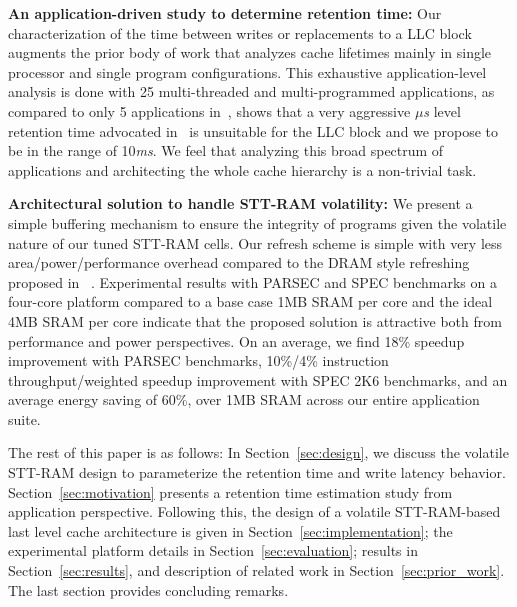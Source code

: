\noindent\textbf{An application-driven study to determine retention time:}
Our characterization of the time between writes or replacements to a LLC block
augments the prior body of work that analyzes cache lifetimes mainly in
single processor and single program configurations. This exhaustive application-level analysis is done with
25 multi-threaded and multi-programmed applications, as compared to only 5 applications in~\cite{STTRAM:HPCA11},
shows that a very aggressive {\it $\mu$s} level retention time advocated in~\cite{STTRAM:HPCA11} is
unsuitable for the LLC block and we propose to be in the range of 10{\it ms}.
We feel that analyzing this broad spectrum of applications and architecting the 
whole cache hierarchy is a non-trivial task.


\noindent\textbf{Architectural solution to handle STT-RAM volatility:} We present a simple buffering
mechanism to ensure the integrity of programs given the volatile nature of our tuned STT-RAM cells.
Our refresh scheme is simple with very less area/power/performance overhead compared to the 
DRAM style refreshing proposed in ~\cite{STTRAM:HPCA11}.
Experimental results with PARSEC and SPEC benchmarks on a four-core platform
compared to a base case 1MB SRAM per core and the ideal 4MB SRAM per core indicate that the proposed
solution is attractive both from performance and power perspectives. On an average, we find 18\% speedup
improvement with PARSEC benchmarks, 10\%/4\% instruction throughput/weighted speedup improvement
with SPEC 2K6 benchmarks, and an average energy saving of 60\%, over 1MB SRAM across our entire application suite.




The rest of this paper is as follows: In Section~\ref{sec:design}, we discuss the volatile STT-RAM design to
parameterize the retention time and write latency behavior. Section~\ref{sec:motivation} presents a retention time
estimation study from application perspective. Following this, the design of a volatile STT-RAM-based last
level cache architecture is given in Section~\ref{sec:implementation}; the experimental platform details in Section~\ref{sec:evaluation};
results in Section~\ref{sec:results}, and description of related work in Section~\ref{sec:prior_work}.
The last section provides concluding remarks.


